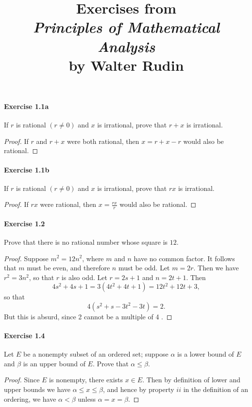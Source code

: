 \documentclass{article}
\title{\textbf{
Exercises from \\
\textit{Principles of Mathematical Analysis} \\
by Walter Rudin
}}
\date{}
\theoremstyle{definition}
\begin{document}
\maketitle


\paragraph{Exercise 1.1a} If $r$ is rational $(r \neq 0)$ and $x$ is irrational, prove that $r+x$ is irrational.
\begin{proof}
    If $r$ and $r+x$ were both rational, then $x=r+x-r$ would also be rational.
\end{proof}



\paragraph{Exercise 1.1b} If $r$ is rational $(r \neq 0)$ and $x$ is irrational, prove that $rx$ is irrational.
\begin{proof}
    If $r x$ were rational, then $x=\frac{r x}{r}$ would also be rational.
\end{proof}



\paragraph{Exercise 1.2} Prove that there is no rational number whose square is $12$.
\begin{proof}
    Suppose $m^2=12 n^2$, where $m$ and $n$ have no common factor. It follows that $m$ must be even, and therefore $n$ must be odd. Let $m=2 r$. Then we have $r^2=3 n^2$, so that $r$ is also odd. Let $r=2 s+1$ and $n=2 t+1$. Then
$$
4 s^2+4 s+1=3\left(4 t^2+4 t+1\right)=12 t^2+12 t+3,
$$
so that
$$
4\left(s^2+s-3 t^2-3 t\right)=2 .
$$
But this is absurd, since 2 cannot be a multiple of 4 .
\end{proof}



\paragraph{Exercise 1.4} Let $E$ be a nonempty subset of an ordered set; suppose $\alpha$ is a lower bound of $E$ and $\beta$ is an upper bound of $E$. Prove that $\alpha \leq \beta$.
\begin{proof}
Since $E$ is nonempty, there exists $x \in E$. Then by definition of lower and upper bounds we have $\alpha \leq x \leq \beta$, and hence by property $i i$ in the definition of an ordering, we have $\alpha<\beta$ unless $\alpha=x=\beta$.
\end{proof}
\end{document}
